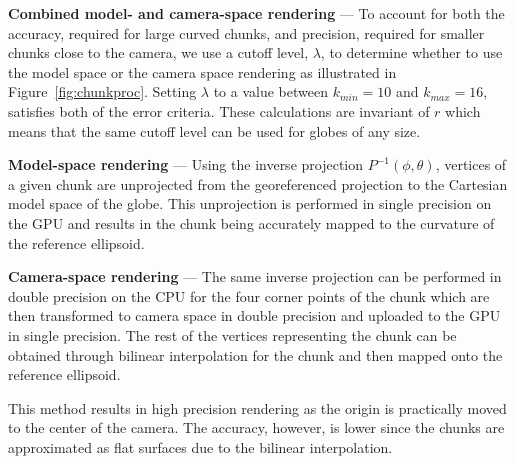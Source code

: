 \documentclass[journal]{vgtc}                %
\newcommand{\fig}[1]{Figure~\ref{fig:#1}}
\begin{document}
\noindent\textbf{Combined model- and camera-space rendering} ---
To account for both the accuracy, required for large curved chunks, and precision, required for smaller chunks close to the camera, we use a cutoff level, $\lambda$, to determine whether to use the model space or the camera space rendering as illustrated in \fig{chunkproc}.
Setting  $\lambda$ to a value between $k_{min} = 10$ and $k_{max} = 16$, satisfies both of the error criteria. These calculations are invariant of $r$ which means that the same cutoff level can be used for globes of any size.

\iffalse

\noindent\textbf{Model-space rendering} ---
Using the inverse projection $P^{-1}(\phi,\theta)$, vertices of a given chunk are unprojected from the georeferenced projection to the Cartesian model space of the globe.
This unprojection is performed in single precision on the GPU and results in the chunk being accurately mapped to the curvature of the reference ellipsoid.


\noindent\textbf{Camera-space rendering} ---
The same inverse projection can be performed in double precision on the CPU for the four corner points of the chunk which are then transformed to camera space in double precision and uploaded to the GPU in single precision.
The rest of the vertices representing the chunk can be obtained through bilinear interpolation for the chunk and then mapped onto the reference ellipsoid.

This method results in high precision rendering as the origin is practically moved to the center of the camera.
The accuracy, however, is lower since the chunks are approximated as flat surfaces due to the bilinear interpolation.

\end{document}
